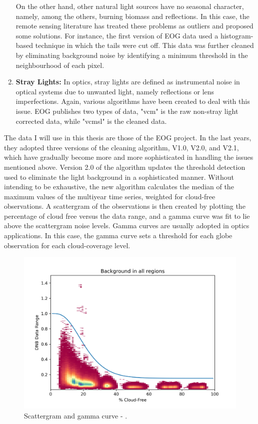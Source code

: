 \begin{enumerate}
On the other hand, other natural light sources have no seasonal character, namely, among the others, burning biomass and reflections. In this case, the remote sensing literature has treated these problems as outliers and proposed some solutions. For instance, the first version of EOG data used a histogram-based technique in which the tails were cut off. This data was further cleaned by eliminating background noise by identifying a minimum threshold in the neighbourhood of each pixel.
\item \textbf{Stray Lights:} In optics, stray lights are defined as instrumental noise in optical systems due to unwanted light, namely reflections or lens imperfections. Again, various algorithms have been created to deal with this issue. EOG publishes two types of data, "vcm" is the raw non-stray light corrected data, while "vcmsl" is the cleaned data.
\end{enumerate}
The data I will use in this thesis are those of the EOG project. In the last years, they adopted three versions of the cleaning algorithm, V1.0, V2.0, and V2.1, which have gradually become more and more sophisticated in handling the issues mentioned above.
Version 2.0 of the algorithm updates the threshold detection used to eliminate the light background in a sophisticated manner. Without intending to be exhaustive, the new algorithm calculates the median of the maximum values of the multiyear time series, weighted for cloud-free observations. A scattergram of the observations is then created by plotting the percentage of cloud free versus the data range, and a gamma curve was fit to lie above the scattergram noise levels. Gamma curves are usually adopted in optics applications. In this case, the gamma curve sets a threshold for each globe observation for each cloud-coverage level. 
\begin{figure}[h!]
    \centering
    \includegraphics[width=13cm]{images/scattergram.jpg}
    \centering
    \caption{Scattergram and gamma curve - \citep{elvidge2021annual}.}
    \label{fig:scattergram}
\end{figure}

